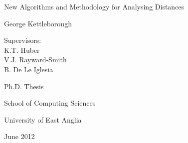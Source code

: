 \documentclass[a4paper,12pt]{report}
\title{\reporttitle}
\author{\reportauthor}
\newcommand{\reporttitle}{New Algorithms and Methodology for Analysing
  Distances}
\newcommand{\reportauthor}{George Kettleborough}
\newcommand{\0}{{\emptyset}}
\begin{document}

\begin{titlepage}
\begin{center}
\vspace*{1in}
{\LARGE \reporttitle}
\par
\vspace{1.5in}
{\large \reportauthor}
\par
\vspace{.3in}
{ Supervisors:\\
K.T. Huber\\
V.J. Rayward-Smith\\
B. De Le Iglesia}
\par
\vfill
Ph.D. Thesis
\par
\vspace{0.5in}
School of Computing Sciences
\par
\vspace{0.5in}
University of East Anglia
\par
\vspace{0.5in}
June 2012
\end{center}
\end{titlepage}

\newpage

\begin{abstract}
  Metrics arise in a wide variety of different contexts one of which is
  clustering, that is, the problem of finding groups of similar objects within
  a set of objects.  These groups are seemingly very easy to find for humans,
  but very difficult to find for machines as there are two major difficulties
  to be overcome: defining precisely an objective criterion for the vague
  notion of ``groups of similar objects'', and the computational complexity of
  finding such groups given a criterion.  In the first part of this thesis, we
  focus mainly on the first difficulty and show that even seemingly similar
  optimisation criteria used for partitional clustering can produce vastly
  different results.

  A further area in which metrics arise is the reconstruction of (rooted
  edge-weighted leaf-labelled) trees from distances.  It is well-known that a
  tree can be uniquely reconstructed from the matrix of distances between each
  pair of leaves if these distances have been induced by a tree in the first
  place.  But the complete matrix may not always be available in practice.  In
  the second part of this thesis we look at some of the circumstances under
  which a tree can be uniquely reconstructed from only an incomplete matrix of
  distances.  We call this process ``lassoing'' a tree.  We then look into the
  problem of the construction of supertrees from lassoed trees.
\end{abstract}
\newpage
\end{document}

